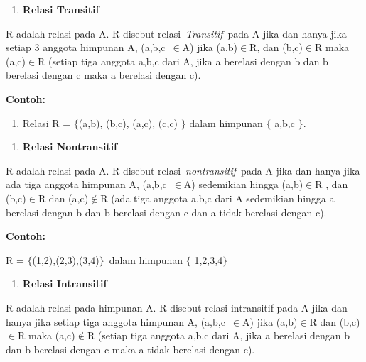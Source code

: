 \documentclass[11pt,fleqn]{book} %
\begin{document}
\noindent 

\begin{enumerate}
\item  \textbf{Relasi Transitif}
\end{enumerate}

\noindent 

\noindent R adalah relasi pada A. R disebut relasi~\textit{Transitif}~pada A jika dan hanya jika setiap 3 anggota himpunan A, (a,b,c~$\mathrm{\in }$A) jika (a,b)$\mathrm{\in }$R, dan (b,c)$\mathrm{\in }$R maka (a,c)$\mathrm{\in }$R (setiap tiga anggota a,b,c dari A, jika a berelasi dengan b dan b berelasi dengan c maka a berelasi dengan c).

\noindent \textbf{}

\noindent \textbf{Contoh:}

\begin{enumerate}
\item  Relasi R = $\{$(a,b), (b,c), (a,c), (c,c) $\}$ dalam himpunan $\{$ a,b,c $\}$.
\end{enumerate}

\noindent 

\begin{enumerate}
\item  \textbf{Relasi Nontransitif}
\end{enumerate}

\noindent 

\noindent R adalah relasi pada A. R disebut relasi~\textit{nontransitif}~pada A jika dan hanya jika ada tiga anggota himpunan A, (a,b,c~$\mathrm{\in }$A) sedemikian hingga (a,b)$\mathrm{\in }$R , dan (b,c)$\mathrm{\in }$R dan (a,c)$\mathrm{\notin }$R (ada tiga anggota a,b,c dari A sedemikian hingga a berelasi dengan b dan b berelasi dengan c dan a tidak berelasi dengan c).

\noindent 

\noindent \textbf{Contoh:}

\noindent R = $\{$(1,2),(2,3),(3,4)$\}$~dalam himpunan $\{$ 1,2,3,4$\}$

\noindent 

\begin{enumerate}
\item  \textbf{Relasi Intransitif}
\end{enumerate}

\noindent 

\noindent R adalah relasi pada himpunan A. R disebut relasi intransitif pada A jika dan hanya jika setiap tiga anggota himpunan A, (a,b,c~$\mathrm{\in }$A) jika (a,b)$\mathrm{\in }$R dan (b,c)$\mathrm{\in }$R maka (a,c)$\mathrm{\notin }$R (setiap tiga anggota a,b,c dari A, jika a berelasi dengan b dan b berelasi dengan c maka a tidak berelasi dengan c).
\end{document}
